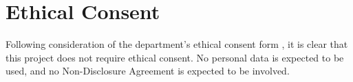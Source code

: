 \section{Ethical Consent}
Following consideration of the department's ethical consent form \cite{ethical-consent}, it is clear that this project does not require ethical consent. No personal data is expected to be used, and no Non-Disclosure Agreement is expected to be involved.